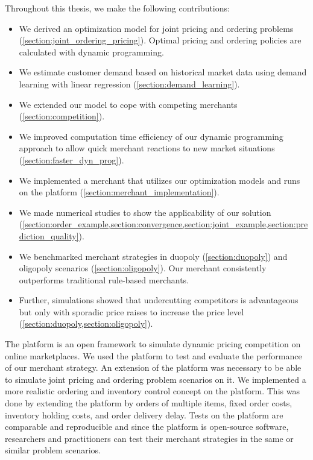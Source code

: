Throughout this thesis, we make the following contributions:
\begin{itemize}
	\item We derived an optimization model for joint pricing and ordering problems (\cref{section:joint_ordering_pricing}). Optimal pricing and ordering policies are calculated with dynamic programming.
	\item We estimate customer demand based on historical market data using demand learning with linear regression (\cref{section:demand_learning}).
	\item We extended our model to cope with competing merchants (\cref{section:competition}).
	\item We improved computation time efficiency of our dynamic programming approach to allow quick merchant reactions to new market situations (\cref{section:faster_dyn_prog}).
	\item We implemented a merchant that utilizes our optimization models and runs on the  \pricewars platform (\cref{section:merchant_implementation}).
	\item We made numerical studies to show the applicability of our solution (\cref{section:order_example,section:convergence,section:joint_example,section:prediction_quality}).
	\item We benchmarked merchant strategies in duopoly (\cref{section:duopoly}) and oligopoly scenarios (\cref{section:oligopoly}). Our merchant consistently outperforms traditional rule-based merchants.
	\item Further, simulations showed that undercutting competitors is advantageous but only with sporadic price raises to increase the price level (\cref{section:duopoly,section:oligopoly}).
\end{itemize}

The \pricewars platform is an open framework to simulate dynamic pricing competition on online marketplaces.
We used the platform to test and evaluate the performance of our merchant strategy.
An extension of the platform was necessary to be able to simulate joint pricing and ordering problem scenarios on it.
We implemented a more realistic ordering and inventory control concept on the \pricewars platform.
This was done by extending the platform by orders of multiple items, fixed order costs, inventory holding costs, and order delivery delay.
Tests on the platform are comparable and reproducible and since the platform is open-source software, researchers and practitioners can test their merchant strategies in the same or similar problem scenarios.




